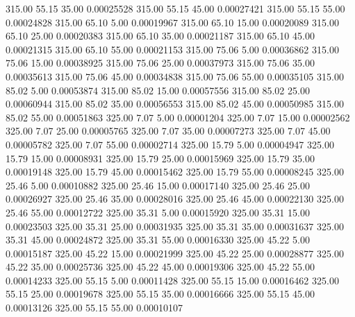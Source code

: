     315.00     55.15     35.00     0.00025528
    315.00     55.15     45.00     0.00027421
    315.00     55.15     55.00     0.00024828
    315.00     65.10      5.00     0.00019967
    315.00     65.10     15.00     0.00020089
    315.00     65.10     25.00     0.00020383
    315.00     65.10     35.00     0.00021187
    315.00     65.10     45.00     0.00021315
    315.00     65.10     55.00     0.00021153
    315.00     75.06      5.00     0.00036862
    315.00     75.06     15.00     0.00038925
    315.00     75.06     25.00     0.00037973
    315.00     75.06     35.00     0.00035613
    315.00     75.06     45.00     0.00034838
    315.00     75.06     55.00     0.00035105
    315.00     85.02      5.00     0.00053874
    315.00     85.02     15.00     0.00057556
    315.00     85.02     25.00     0.00060944
    315.00     85.02     35.00     0.00056553
    315.00     85.02     45.00     0.00050985
    315.00     85.02     55.00     0.00051863
    325.00      7.07      5.00     0.00001204
    325.00      7.07     15.00     0.00002562
    325.00      7.07     25.00     0.00005765
    325.00      7.07     35.00     0.00007273
    325.00      7.07     45.00     0.00005782
    325.00      7.07     55.00     0.00002714
    325.00     15.79      5.00     0.00004947
    325.00     15.79     15.00     0.00008931
    325.00     15.79     25.00     0.00015969
    325.00     15.79     35.00     0.00019148
    325.00     15.79     45.00     0.00015462
    325.00     15.79     55.00     0.00008245
    325.00     25.46      5.00     0.00010882
    325.00     25.46     15.00     0.00017140
    325.00     25.46     25.00     0.00026927
    325.00     25.46     35.00     0.00028016
    325.00     25.46     45.00     0.00022130
    325.00     25.46     55.00     0.00012722
    325.00     35.31      5.00     0.00015920
    325.00     35.31     15.00     0.00023503
    325.00     35.31     25.00     0.00031935
    325.00     35.31     35.00     0.00031637
    325.00     35.31     45.00     0.00024872
    325.00     35.31     55.00     0.00016330
    325.00     45.22      5.00     0.00015187
    325.00     45.22     15.00     0.00021999
    325.00     45.22     25.00     0.00028877
    325.00     45.22     35.00     0.00025736
    325.00     45.22     45.00     0.00019306
    325.00     45.22     55.00     0.00014233
    325.00     55.15      5.00     0.00011428
    325.00     55.15     15.00     0.00016462
    325.00     55.15     25.00     0.00019678
    325.00     55.15     35.00     0.00016666
    325.00     55.15     45.00     0.00013126
    325.00     55.15     55.00     0.00010107
